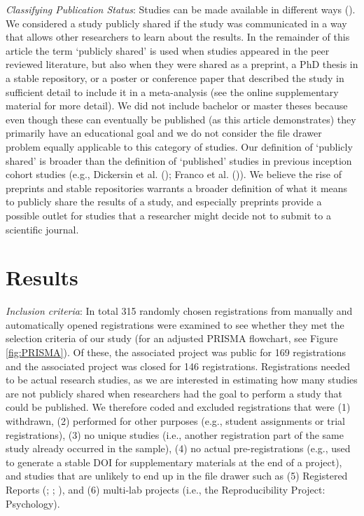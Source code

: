 \documentclass[
  ,man, a4paper,floatsintext]{apa6}
\begin{document}
\emph{Classifying Publication Status}: Studies can be made available in different ways (). We considered a study publicly shared if the study was communicated in a way that allows other researchers to learn about the results. In the remainder of this article the term `publicly shared' is used when studies appeared in the peer reviewed literature, but also when they were shared as a preprint, a PhD thesis in a stable repository, or a poster or conference paper that described the study in sufficient detail to include it in a meta-analysis (see the online supplementary material for more detail). We did not include bachelor or master theses because even though these can eventually be published (as this article demonstrates) they primarily have an educational goal and we do not consider the file drawer problem equally applicable to this category of studies. Our definition of `publicly shared' is broader than the definition of `published' studies in previous inception cohort studies (e.g., Dickersin et al. (); Franco et al. ()). We believe the rise of preprints and stable repositories warrants a broader definition of what it means to publicly share the results of a study, and especially preprints provide a possible outlet for studies that a researcher might decide not to submit to a scientific journal.

\section{Results}\label{results}

\emph{Inclusion criteria}: In total 315 randomly chosen registrations from manually and automatically opened registrations were examined to see whether they met the selection criteria of our study (for an adjusted PRISMA flowchart, see Figure \ref{fig:PRISMA}). Of these, the associated project was public for 169 registrations and the associated project was closed for 146 registrations. Registrations needed to be actual research studies, as we are interested in estimating how many studies are not publicly shared when researchers had the goal to perform a study that could be published. We therefore coded and excluded registrations that were (1) withdrawn, (2) performed for other purposes (e.g., student assignments or trial registrations), (3) no unique studies (i.e., another registration part of the same study already occurred in the sample), (4) no actual pre-registrations (e.g., used to generate a stable DOI for supplementary materials at the end of a project), and studies that are unlikely to end up in the file drawer such as (5) Registered Reports (; ; ), and (6) multi-lab projects (i.e., the Reproducibility Project: Psychology).
\end{document}
